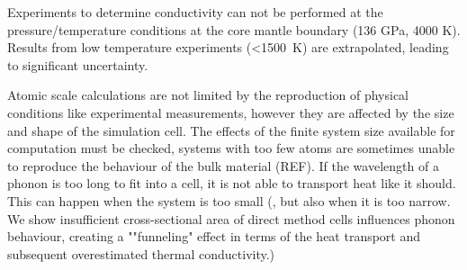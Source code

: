 \documentclass[%
preprint,                                  %
nofootinbib,
 amsmath,amssymb,
 aps,
]{revtex4-1}
\begin{document}
% 



Experiments to determine conductivity can not be performed at the pressure/temperature conditions at the core mantle boundary (136 GPa, 4000 K). Results from low temperature experiments (\textless1500~K) are extrapolated, leading to significant uncertainty.



Atomic scale calculations are not limited by the reproduction of physical conditions like experimental measurements, however they are affected by the size and shape of the simulation cell. The effects of the finite system size available for computation must be checked, systems with too few atoms are sometimes unable to reproduce the behaviour of the bulk material (REF). If the wavelength of a phonon is too long to fit into a cell, it is not able to transport heat like it should. This can happen when the system is too small  (, but also when it is too narrow. We show insufficient cross-sectional area of direct method cells influences phonon behaviour, creating a ""funneling" effect in terms of the heat transport and subsequent overestimated thermal conductivity.)



\end{document}
